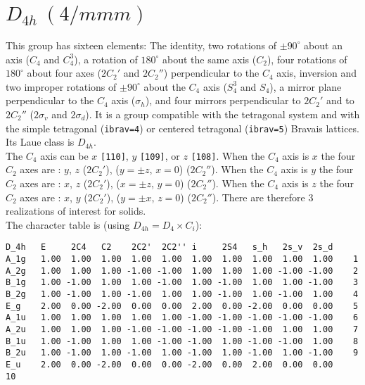 \documentclass[12pt,a4paper,twoside]{report}
\begin{document}
\newpage
{\color{coral}\section{$D_{4h}\ (4/mmm)$}} 
\color{black}
This group has sixteen elements: The identity, two rotations of $\pm90^\circ$
about an axis ($C_4$ and $C_4^3$), a rotation of $180^\circ$ about the 
same axis ($C_2$), four rotations of $180^\circ$ about four axes ($2C_2'$
and $2C_2''$) perpendicular to the $C_4$ axis, inversion and two improper 
rotations of $\pm90^\circ$ about the $C_4$ axis ($S_4^3$ and $S_4$), a 
mirror plane perpendicular to the $C_4$ axis ($\sigma_h$),
and four mirrors perpendicular to $2C_2'$ and to $2C_2''$ 
($2\sigma_v$ and $2\sigma_d$). 
It is a group compatible with the tetragonal system 
and with the simple tetragonal (\texttt{ibrav=4}) or centered tetragonal
(\texttt{ibrav=5}) Bravais lattices. \\
Its Laue class is $D_{4h}$. \\
The $C_4$ axis can be $x$ \texttt{[110]}, $y$ \texttt{[109]}, 
or $z$ \texttt{[108]}. 
When the $C_4$ axis is $x$ the four $C_2$ axes are : $y$, $z$ ($2C_2'$),
($y=\pm z$, $x=0$) ($2C_2''$).  
When the $C_4$ axis is $y$ the four $C_2$ axes are : $x$, $z$ ($2C_2'$),
($x=\pm z$, $y=0$) ($2C_2''$).  
When the $C_4$ axis is $z$ the four $C_2$ axes are : $x$, $y$ ($2C_2'$),
($y=\pm x$, $z=0$) ($2C_2''$).  
There are therefore $3$ realizations of interest for solids. \\
The character table is (using $D_{4h}=D_4 \times C_i$):

\begin{tcolorbox}
\begin{footnotesize}
\begin{verbatim}
D_4h   E     2C4   C2    2C2'  2C2'' i     2S4   s_h   2s_v  2s_d 
A_1g   1.00  1.00  1.00  1.00  1.00  1.00  1.00  1.00  1.00  1.00    1
A_2g   1.00  1.00  1.00 -1.00 -1.00  1.00  1.00  1.00 -1.00 -1.00    2
B_1g   1.00 -1.00  1.00  1.00 -1.00  1.00 -1.00  1.00  1.00 -1.00    3
B_2g   1.00 -1.00  1.00 -1.00  1.00  1.00 -1.00  1.00 -1.00  1.00    4
E_g    2.00  0.00 -2.00  0.00  0.00  2.00  0.00 -2.00  0.00  0.00    5
A_1u   1.00  1.00  1.00  1.00  1.00 -1.00 -1.00 -1.00 -1.00 -1.00    6
A_2u   1.00  1.00  1.00 -1.00 -1.00 -1.00 -1.00 -1.00  1.00  1.00    7
B_1u   1.00 -1.00  1.00  1.00 -1.00 -1.00  1.00 -1.00 -1.00  1.00    8
B_2u   1.00 -1.00  1.00 -1.00  1.00 -1.00  1.00 -1.00  1.00 -1.00    9
E_u    2.00  0.00 -2.00  0.00  0.00 -2.00  0.00  2.00  0.00  0.00    10
\end{verbatim}
\end{footnotesize}
\end{tcolorbox}
\end{document}
